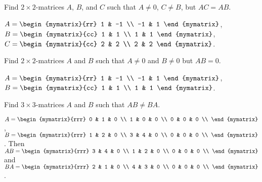 \begin{ex}
  Find $2\times 2$-matrices $A$, $B$, and $C$ such that
  $A\neq 0$, $C\neq B$,
  but $AC=AB$.
  \begin{sol}
    $A = \begin{mymatrix}{rr}
      1 & -1 \\
      -1 & 1
    \end{mymatrix}$, $B = \begin{mymatrix}{cc}
      1 & 1 \\
      1 & 1
    \end{mymatrix}$, $C = \begin{mymatrix}{cc}
      2 & 2 \\
      2 & 2
    \end{mymatrix}$.
  \end{sol}
\end{ex}

\begin{ex}
  Find $2\times 2$-matrices $A$ and $B$ such that $A \neq 0$
  and $B \neq 0$ but $AB = 0$.
  \begin{sol}
    $A = \begin{mymatrix}{rr}
      1 & -1 \\
      -1 & 1
    \end{mymatrix}$, $B = \begin{mymatrix}{cc}
      1 & 1 \\
      1 & 1
    \end{mymatrix}$.
  \end{sol}
\end{ex}

\begin{ex}
  Find $3 \times 3$-matrices $A$ and $B$ such that $AB \neq BA$.
  \begin{sol}
    $A = \begin{mymatrix}{rrr}
      0 & 1 & 0 \\
      1 & 0 & 0 \\
      0 & 0 & 0 \\
    \end{mymatrix}$, $B = \begin{mymatrix}{rrr}
      1 & 2 & 0 \\
      3 & 4 & 0 \\
      0 & 0 & 0 \\
    \end{mymatrix}$. Then
    $AB=
    \begin{mymatrix}{rrr}
      3 & 4 & 0 \\
      1 & 2 & 0 \\
      0 & 0 & 0 \\
    \end{mymatrix}$ and $BA =
    \begin{mymatrix}{rrr}
      2 & 1 & 0 \\
      4 & 3 & 0 \\
      0 & 0 & 0 \\
    \end{mymatrix}$.
  \end{sol}
\end{ex}

